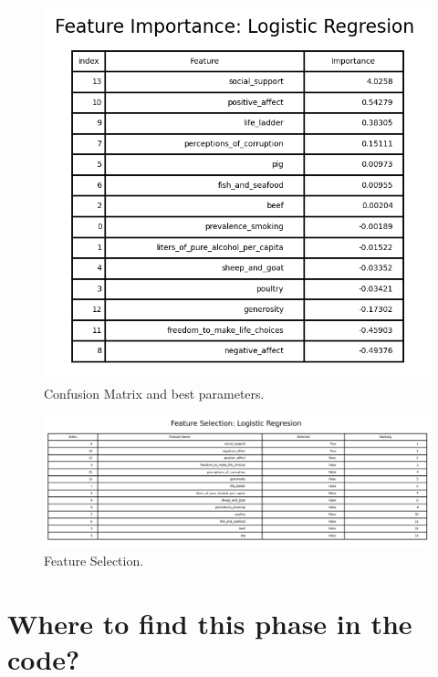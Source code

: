                 \begin{figure}[H]
                        \centering
                        \includegraphics[scale=1]{images/dm_featu_imp_logi_regr}
                        \caption{Confusion Matrix and best parameters.}
                        \label{fig:dm-logistic-regression-bp}
                \end{figure}
                \begin{figure}[H]
                        \centering
                        \includegraphics[scale=0.7]{images/dm_featu_sele_log_regr}
                        \caption{Feature Selection.}
                        \label{fig:dm-logistic-regression-fs-bp}
                \end{figure}


\section{Where to find this phase in the code?}

